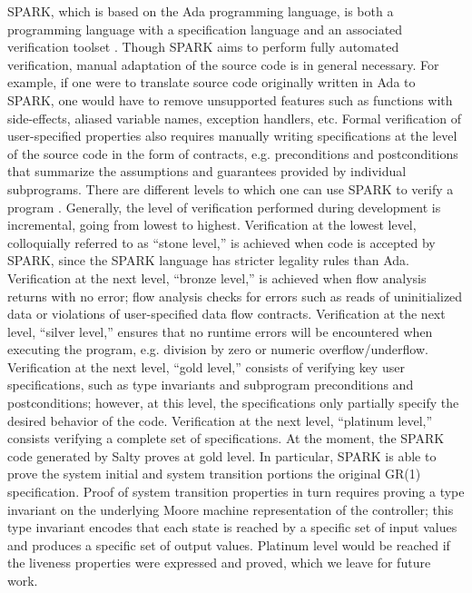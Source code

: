\documentclass[runningheads]{llncs}
\begin{document}
SPARK, which is based on the Ada programming language, is both a programming language 
with a specification language and an associated verification toolset \cite{hoang2015spark}.
Though SPARK aims to perform fully automated verification, manual adaptation of the source code is in general necessary. 
For example, if one were to translate source code originally written in Ada to SPARK, 
one would have to remove unsupported features such as functions with side-effects, aliased variable names, exception handlers, etc.  
Formal verification of user-specified properties also requires manually writing specifications at the level of the source code in the 
form of contracts, e.g. preconditions and postconditions that summarize the assumptions and guarantees provided by individual subprograms.
There are different levels to which one can use SPARK to verify a program \cite{moy2019climbing}. 
Generally, the level of verification performed during development is incremental, going from lowest to highest. 
Verification at the lowest level, colloquially referred to as ``stone level,'' is achieved when code is accepted by SPARK, 
since the SPARK language has stricter legality rules than Ada. 
Verification at the next level, ``bronze level,'' is achieved when flow analysis returns with no error; 
flow analysis checks for errors such as reads of uninitialized data or violations of user-specified data flow contracts. 
Verification at the next level, ``silver level,'' ensures that no runtime errors will be encountered when executing the program, 
e.g. division by zero or numeric overflow/underflow. 
Verification at the next level, ``gold level,''  consists of verifying key user specifications, such as 
type invariants and subprogram preconditions and postconditions; 
however, at this level, the specifications only partially specify the desired behavior of the code.  
Verification at the next level, ``platinum level,'' consists verifying a complete set of specifications.
At the moment, the SPARK code generated by Salty proves at gold level.
In particular, SPARK is able to prove the system initial and system transition portions the original GR(1) specification. 
Proof of system transition properties in turn requires proving a type invariant on the underlying Moore machine representation of the controller; 
this type invariant encodes that each state is reached by a specific set of input values and produces a specific set of output values. 
Platinum level would be reached if the liveness properties were expressed and proved, 
which we leave for future work.
\end{document}
